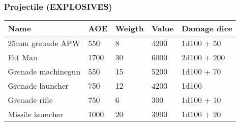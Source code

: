 
\subsubsection{Projectile (EXPLOSIVES)}
\begin{longtable}{|p{4cm}|p{1.5cm}|p{1.5cm}|p{2cm}|p{4cm}|}
\hline
\bfseries Name & \bfseries AOE & \bfseries Weigth & \bfseries Value & \bfseries Damage dice \\
\hline
\endhead
25mm grenade APW & 550 & 8 & 4200 & 1d100 + 50 \\
Fat Man & 1700 & 30 & 6000 & 2d100 + 200 \\
Grenade machinegun & 550 & 15 & 5200 & 1d100 + 70 \\
Grenade launcher & 750 & 12 & 4200 & 1d100 \\
Grenade rifle & 750 & 6 & 300 & 1d100 + 10 \\
Missile launcher & 1000 & 20 & 3900 & 1d100 + 20 \\
\hline
\end{longtable}
